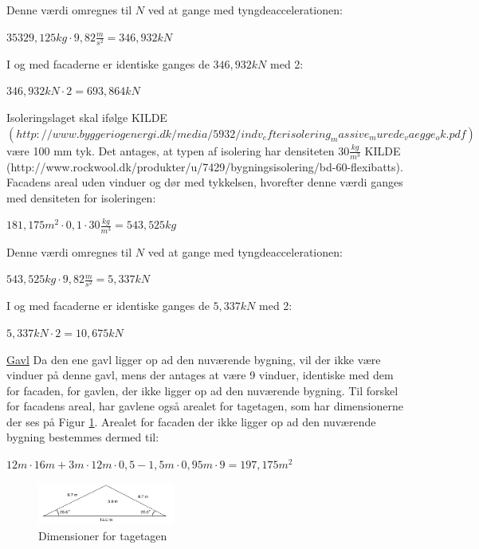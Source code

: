 Denne værdi omregnes til $N$ ved at gange med tyngdeaccelerationen:
\begin{center}
	$35329,125 kg\cdot 9,82 \frac{m}{s^2}=346,932 kN$
\end{center}

I og med facaderne er identiske ganges de $346,932 kN$ med 2:
\begin{center}
	$346,932 kN\cdot 2=693,864 kN$
\end{center}

Isoleringslaget skal ifølge KILDE$(http://www.byggeriogenergi.dk/media/5932/indv_efterisolering_massive_murede_vaegge_ok.pdf)$ være 100 mm tyk. Det antages, at typen af isolering har densiteten $30 \frac{kg}{m^3}$ KILDE (http://www.rockwool.dk/produkter/u/7429/bygningsisolering/bd-60-flexibatts).
\newline \indent{     }  Facadens areal uden vinduer og dør med tykkelsen, hvorefter denne værdi ganges med densiteten for isoleringen:
\begin{center}
	$181,175 m^2\cdot 0,1 \cdot 30 \frac{kg}{m^3}=543,525 kg$
\end{center}

Denne værdi omregnes til $N$ ved at gange med tyngdeaccelerationen:
\begin{center}
	$543,525 kg\cdot 9,82 \frac{m}{s^2}=5,337 kN$
\end{center}

I og med facaderne er identiske ganges de $5,337 kN$ med 2:
\begin{center}
	$5,337 kN\cdot 2=10,675 kN$
\end{center}

\underline{Gavl}
Da den ene gavl ligger op ad den nuværende bygning, vil der ikke være vinduer på denne gavl, mens der antages at være 9 vinduer, identiske med dem for facaden, for gavlen, der ikke ligger op ad den nuværende bygning. Til forskel for facadens areal, har gavlene også arealet for tagetagen, som har dimensionerne der ses på Figur \ref{fig:tagetage}. Arealet for facaden der ikke ligger op ad den nuværende bygning bestemmes dermed til:
\begin{center}
	$12 m\cdot 16 m + 3 m\cdot 12 m \cdot 0,5 - 1,5 m\cdot 0,95 m \cdot 9=197,175 m^2$
\end{center}

\begin{figure}[htbp]
	\centering
	\includegraphics[width=0.4\textwidth]{billeder/Tagmedvinkel.png}
	\caption{Dimensioner for tagetagen}
	\label{fig:tagetage}
\end{figure}

